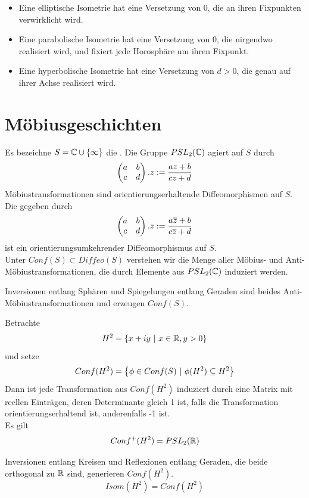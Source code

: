 \documentclass{book}
\begin{document}
\Kor{}
\begin{itemize}
	\item Eine elliptische Isometrie hat eine Versetzung von 0, die an ihren Fixpunkten verwirklicht wird.
	\item Eine parabolische Isometrie hat eine Versetzung von 0, die nirgendwo realisiert wird, und fixiert jede Horosphäre um ihren Fixpunkt.
	\item Eine hyperbolische Isometrie hat eine Versetzung von $d > 0$, die genau auf ihrer Achse realisiert wird.
\end{itemize}

\section{Möbiusgeschichten}
\Def{}
Es bezeichne $S = \mathbb{C} \cup \{\infty\}$ die . Die Gruppe $PSL_2(\mathbb{C})$ agiert auf $S$ durch 
\[ \left(
\begin{matrix}
a & b\\
c & d
\end{matrix}
\right).z := \frac{az + b}{cz + d} \]
Möbiustransformationen sind orientierungserhaltende Diffeomorphismen auf $S$.\\
Die  gegeben durch
\[ \left(
	\begin{matrix}
	a & b\\
	c & d
	\end{matrix}
\right).z := \frac{a\overline{z} + b}{c\overline{z} + d} \]
ist ein orientierungsumkehrender Diffeomorphismus auf $S$.\\
Unter $Conf(S) \subset Diffeo(S)$ verstehen wir die Menge aller Möbius- und Anti-Möbiustransformationen, die durch Elemente aus $PSL_2(\mathbb{C})$ induziert werden.

\Prop{}
Inversionen entlang Sphären und Spiegelungen entlang Geraden sind beides Anti-Möbiustransformationen und erzeugen $Conf(S)$.

\Lem{}
Betrachte
\[ H^2 = \set{ x + iy}{x \in \R, y > 0} \]
und setze
\[ Conf(H^2) = \set{\phi \in Conf(S)}{\phi(H^2) \subseteq H^2} \]
Dann ist jede Transformation aus $Conf(H^2)$ induziert durch eine Matrix mit reellen Einträgen, deren Determinante gleich 1 ist, falls die Transformation orientierungserhaltend ist, anderenfalls -1 ist.\\
Es gilt
\[ Conf^+(H^2) = PSL_2(\mathbb{R}) \]

\Prop{}
Inversionen entlang Kreisen und Reflexionen entlang Geraden, die beide orthogonal zu $\mathbb{R}$ sind, generieren $Conf(H^2)$.
\Kor{}
\[ Isom(H^2) = Conf(H^2)  \]
\end{document}
